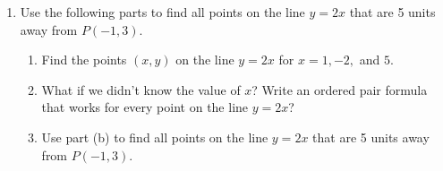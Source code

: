 \begin{enumerate}
\begin{boxthm}
{\bf Problem Solving Process}
\begin{enumerate}
\item Re-read the problem.
\item Determine what the problem is asking for along with the format of that answer.
\item Circle/Underline the important components of the problem.
\item Determine the topics/concepts being assessed.
\item Write down relevant formulas, definitions, and equations.
\item Discuss your ideas with your group.
\item Solve the problem and verify that your solution answers the question in the correct format.
\end{enumerate}

\end{boxthm}
\vfill
\newpage

\item Use the following parts to find all points on the line $y=2x$ that are 5 units away from $P(-1,3)$.  
\begin{enumerate}
\item Find the points $(x,y)$ on the line $y=2x$ for $x=1, -2,$ and $5$.
\vfill
\item What if we didn't know the value of $x$?  Write an ordered pair formula that works for every point on the line $y=2x$?\vfill
\item Use part (b) to find all points on the line $y=2x$ that are 5 units away from $P(-1,3)$. 
\vfill
\vfill
\vfill
\end{enumerate}
\newpage





\end{enumerate}













